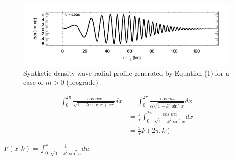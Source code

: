 \documentclass{article}
\begin{document}
\begin{figure}[h] 
\centering 
\includegraphics[width=1.0\textwidth]{Linear_Density_WM.jpg}
\caption{Synthetic density-wave radial profile generated by Equation (1) for a case of $m>0$ (prograde) \cite{Tiscareno_2007}.} \label{fig:my_label}
\end{figure}







\begin{align*}
\int_0^{2 \pi} \frac{\cos mx}{\sqrt{1 - 2 \alpha \cos x + \alpha^2}} dx &= \int_0^{2 \pi} \frac{\cos mx}{\alpha \sqrt{1 - k^2 \sin^2 x}} dx \\
&= \frac{1}{\alpha} \int_0^{2 \pi} \frac{\cos mx}{\sqrt{1 - k^2 \sin^2 x}} dx \\
&= \frac{1}{\alpha} F(2 \pi, k)
\end{align*}

$F(x, k) = \int_0^x \frac{1}{\sqrt{1 - k^2 \sin^2 u}} du$














\end{document}
